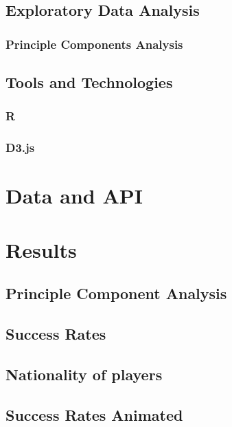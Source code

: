 \documentclass[a4paper,11pt]{article}
\begin{document}
\subsection{Exploratory Data Analysis} %


\subsubsection{Principle Components Analysis}


\subsection{Tools and Technologies} %
\subsubsection{R} %


\subsubsection{D3.js} %
\section{Data and API}

\section{Results}
\subsection{Principle Component Analysis}

\label{sec:PCA}

\subsection{Success Rates}


\subsection{Nationality of players}

\subsection{Success Rates Animated}

\end{document}
